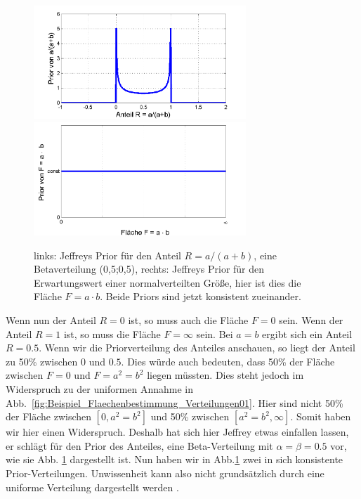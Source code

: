 \begin{figure}[!ht]
	\begin{center}
		\includegraphics[width=80mm]{12_vorlesung_GUMS2/media/prior_des_Anteils_2.png}
		\includegraphics[width=80mm]{12_vorlesung_GUMS2/media/prior_der_Flaeche_2.png}
		\caption{ links: Jeffreys Prior für den Anteil $R=a/(a+b)$, eine Betaverteilung (0,5;0,5), rechts: Jeffreys Prior für den Erwartungswert einer normalverteilten Größe, hier ist dies die Fläche $F = a\cdot b.$ Beide Priors sind jetzt konsistent zueinander.}
		\label{fig:Beispiel_Flaechenbestimmung_Verteilungen02}
	\end{center}
\end{figure}
Wenn nun der Anteil $R=0$ ist, so muss auch die Fläche $F=0$ sein.
Wenn der Anteil $R=1$ ist, so muss die Fläche $F=\infty$ sein.
Bei $a=b$ ergibt sich ein Anteil $R=0.5$. Wenn wir die Priorverteilung
des Anteiles anschauen, so liegt der Anteil zu 50\% zwischen $0$
und $0.5$. Dies würde auch bedeuten, dass 50\% der Fläche zwischen
$F=0$ und $F=a^2= b^2$ liegen müssten. Dies steht jedoch im Widerspruch
zu der uniformen Annahme in Abb.~\ref{fig:Beispiel_Flaechenbestimmung_Verteilungen01}.
Hier sind nicht 50\% der Fläche zwischen $[0,a^2=b^2]$ und 50\%
zwischen $[a^2=b^2,\infty]$.
Somit haben wir hier einen Widerspruch.
Deshalb hat sich hier Jeffrey \cite{Hel08} etwas einfallen lassen,
er schlägt für den Prior des Anteiles, eine Beta-Verteilung
mit $\alpha = \beta = 0.5 $ vor, wie sie Abb. \ref{fig:Beispiel_Flaechenbestimmung_Verteilungen02} dargestellt ist. Nun haben wir in Abb.\ref{fig:Beispiel_Flaechenbestimmung_Verteilungen02}
zwei in sich konsistente Prior-Verteilungen.
Unwissenheit kann also nicht grundsätzlich durch eine uniforme Verteilung
dargestellt werden \cite{Tsc14}.

